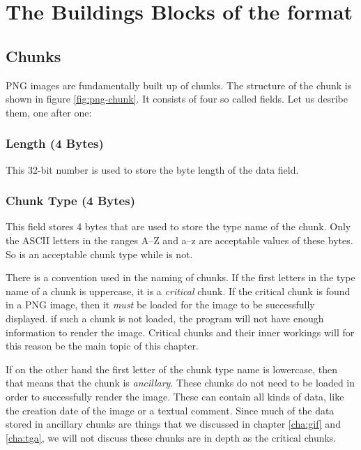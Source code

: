 \section{The Buildings Blocks of the format}

\subsection{Chunks}

PNG images are fundamentally built up of chunks. The structure of the
chunk is shown in figure \ref{fig:png-chunk}. It consists of four so
called fields. Let us desribe them, one after one:

\subsubsection*{Length (4 Bytes)}

This 32-bit number is used to store the byte length of the data
field.


\subsubsection*{Chunk Type (4 Bytes)}

This field stores 4 bytes that are used to store the type name of the
chunk. Only the ASCII letters in the ranges A--Z and a--z are
acceptable values of these bytes. So  is an acceptable
chunk type while  is not.

There is a convention used in the naming of chunks. If the first
letters in the type name of a chunk is uppercase, it is a
\textit{critical} chunk. If the critical chunk is found in a PNG
image, then it \textit{must} be loaded for the image to be
successfully displayed.  if such a chunk is not loaded, the program
will not have enough information to render the image. Critical chunks
and their inner workings will for this reason be the main topic of
this chapter.

If on the other hand the first letter of the chunk type name is
lowercase, then that means that the chunk is \textit{ancillary}. These
chunks do not need to be loaded in order to successfully render the
image. These can contain all kinds of data, like the creation date of
the image or a textual comment. Since much of the data stored in
ancillary chunks are things that we discussed in chapter \ref{cha:gif}
and \ref{cha:tga}, we will not discuss these chunks are in depth as
the critical chunks.

